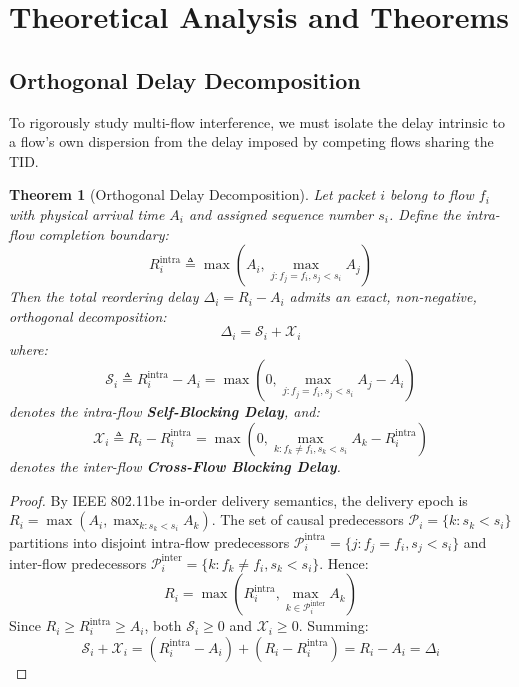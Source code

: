 \documentclass[10pt,journal,compsoc]{IEEEtran}
\newtheorem{theorem}{Theorem}
\begin{document}
\section{Theoretical Analysis and Theorems}
\label{sec:theory}

\subsection{Orthogonal Delay Decomposition}

To rigorously study multi-flow interference, we must isolate the delay intrinsic to a flow's own dispersion from the delay imposed by competing flows sharing the TID.

\begin{theorem}[Orthogonal Delay Decomposition]
\label{thm:decomp}
Let packet $i$ belong to flow $f_i$ with physical arrival time $A_i$ and assigned sequence number $s_i$. Define the intra-flow completion boundary:
\begin{equation}
    R_i^{\text{intra}} \triangleq \max\left(A_i, \max_{j: f_j = f_i, s_j < s_i} A_j\right)
\end{equation}
Then the total reordering delay $\Delta_i = R_i - A_i$ admits an exact, non-negative, orthogonal decomposition:
\begin{equation}
    \Delta_i = \mathcal{S}_i + \mathcal{X}_i
\end{equation}
where:
\begin{equation}
    \mathcal{S}_i \triangleq R_i^{\text{intra}} - A_i = \max\left(0, \max_{j: f_j = f_i, s_j < s_i} A_j - A_i\right)
\end{equation}
denotes the intra-flow \textbf{Self-Blocking Delay}, and:
\begin{equation}
    \mathcal{X}_i \triangleq R_i - R_i^{\text{intra}} = \max\left(0, \max_{k: f_k \ne f_i, s_k < s_i} A_k - R_i^{\text{intra}}\right)
\end{equation}
denotes the inter-flow \textbf{Cross-Flow Blocking Delay}.
\end{theorem}

\begin{proof}
By IEEE 802.11be in-order delivery semantics, the delivery epoch is $R_i = \max(A_i, \max_{k: s_k < s_i} A_k)$. The set of causal predecessors $\mathcal{P}_i = \{k : s_k < s_i\}$ partitions into disjoint intra-flow predecessors $\mathcal{P}_i^{\text{intra}} = \{j : f_j = f_i, s_j < s_i\}$ and inter-flow predecessors $\mathcal{P}_i^{\text{inter}} = \{k : f_k \ne f_i, s_k < s_i\}$. Hence:
\begin{equation}
    R_i = \max\left( R_i^{\text{intra}}, \max_{k \in \mathcal{P}_i^{\text{inter}}} A_k \right)
\end{equation}
Since $R_i \ge R_i^{\text{intra}} \ge A_i$, both $\mathcal{S}_i \ge 0$ and $\mathcal{X}_i \ge 0$. Summing:
\begin{equation}
    \mathcal{S}_i + \mathcal{X}_i = (R_i^{\text{intra}} - A_i) + (R_i - R_i^{\text{intra}}) = R_i - A_i = \Delta_i
\end{equation}
\end{proof}
\end{document}
